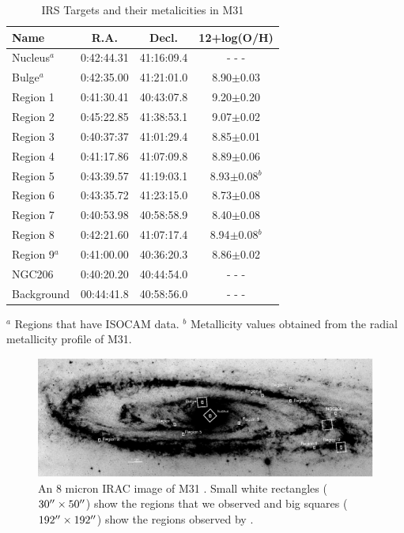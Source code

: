 \documentclass[useAMS,usenatbib,a4paper]{mn2e}
\begin{document}
\begin{table}
 \centering
 \begin{minipage}{70mm}
\caption{IRS Targets and their metalicities in M31\label{regions}}
  \begin{tabular}{lccc}
  \hline Name & R.A. & Decl. &12+log(O/H)
   \\
 \hline
 Nucleus$^a$&0:42:44.31&41:16:09.4& - - -\\
Bulge$^a$&0:42:35.00&41:21:01.0&8.90$\pm$0.03\\
Region 1&0:41:30.41&40:43:07.8&9.20$\pm$0.20\\
Region 2&0:45:22.85&41:38:53.1&9.07$\pm$0.02\\
Region 3&0:40:37:37&41:01:29.4&8.85$\pm$0.01\\
Region 4&0:41:17.86&41:07:09.8&8.89$\pm$0.06\\
Region 5&0:43:39.57&41:19:03.1&\hspace{0.14cm}8.93$\pm$0.08$^b$\\
Region 6&0:43:35.72&41:23:15.0&8.73$\pm$0.08\\
Region 7&0:40:53.98&40:58:58.9&8.40$\pm$0.08\\
Region 8&0:42:21.60&41:07:17.4&\hspace{0.14cm}8.94$\pm$0.08$^b$\\
Region 9$^a$&0:41:00.00&40:36:20.3&8.86$\pm$0.02\\
NGC206&0:40:20.20&40:44:54.0& - - -\\
Background&00:44:41.8&40:58:56.0& - - -\\
\hline
\end{tabular}
{$^a$ Regions that have ISOCAM data. $^b$ Metallicity values obtained from the radial metallicity profile of M31.}
\end{minipage}
\end{table}



\begin{figure}

\centering
\includegraphics[scale=0.9]{./m31_map.eps}
\caption{An 8 micron IRAC image of M31 \citep{Barmby2006lr}. Small white rectangles ($30\hbox{$^{\prime\prime}$}\times50\hbox{$^{\prime\prime}$}$) show the regions that we observed and big squares ($192\hbox{$^{\prime\prime}$}\times192\hbox{$^{\prime\prime}$}$) show the regions observed by \citet{1998Cesarsky}.}
\label{m31}
\end{figure}
\end{document}
